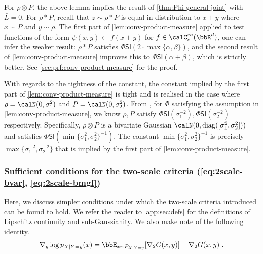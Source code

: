\documentclass[11pt]{article}
\newcounter{ct}
\newcommand{\PhiSI}[1]{\Phi\mathsf{SI}\left(#1\right)}
\newcommand{\cssf}[1]{\calC_{c}^{\infty}(#1)}
\begin{document}
For \(\rho \otimes P\), the above lemma implies the result of \cref{thm:Phi-general-joint} with \(\bar{L} = 0\).
For \(\rho \ast P\), recall that \(z \sim \rho \ast P\) is equal in distribution to \(x + y\) where \(x \sim P\) and \(y \sim \rho\).
The first part of \cref{lem:conv-product-measure} applied to test functions of the form \(\psi(x, y) \leftarrow f(x + y)\) for \(f \in \cssf{\bbR^{d}}\), one can infer the weaker result: \(\rho \ast P\) satisfies \(\PhiSI{2 \cdot \max\{\alpha, \beta\}}\), and the second result of \cref{lem:conv-product-measure} improves this to \(\PhiSI{\alpha + \beta}\), which is strictly better.
See \cref{sec:prf:conv-product-measure} for the proof.

With regards to the tightness of the constant, the constant implied by the first part of \cref{lem:conv-product-measure} is tight and is realised in the case where \(\rho = \calN(0, \sigma^{2}_{1})\) and \(P = \calN(0, \sigma_{2}^{2})\).
From \citet[Cor. 9]{chafai2004entropies}, for \(\Phi\) satisfying the assumption in \cref{lem:conv-product-measure}, we know \(\rho, P\) satisfy \(\PhiSI{\sigma_{1}^{-2}}, \PhiSI{\sigma_{2}^{-2}}\) respectively.
Specifically, \(\rho \otimes P\) is a bivariate Gaussian \(\calN(0, \mathrm{diag}([\sigma_{1}^{2}, \sigma_{2}^{2}]))\) and satisfies \(\PhiSI{\min\{\sigma_{1}^{2}, \sigma_{2}^{2}\}^{-1}}\).
The constant \(\min\{\sigma_{1}^{2}, \sigma_{2}^{2}\}^{-1}\) is precisely \(\max\{\sigma_{1}^{-2}, \sigma_{2}^{-2}\}\) that is implied by the first part of \cref{lem:conv-product-measure}.


\subsubsection{Sufficient conditions for the two-scale criteria (\ref{eq:2scale-bvar}, \ref{eq:2scale-bmgf})}

Here, we discuss simpler conditions under which the two-scale criteria introduced can be found to hold.
We refer the reader to \cref{app:sec:defs} for the definitions of Lipschitz continuity and sub-Gaussianity.
We also make note of the following identity.
\begin{equation*}
    \nabla_{y}\log p_{X | Y = y}(x) = \bbE_{x \sim P_{X | Y = y}}[\nabla_{2}G(x, y)] - \nabla_{2}G(x, y)~.
\end{equation*}
\end{document}
